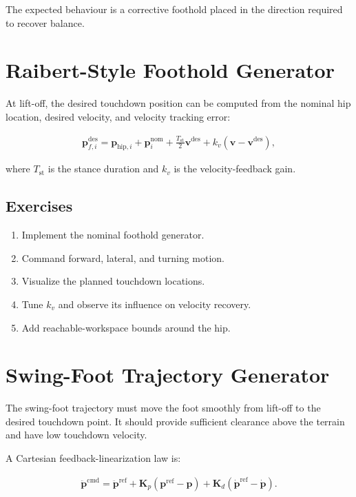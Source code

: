 \documentclass[11pt,a4paper]{article}
\begin{document}
The expected behaviour is a corrective foothold placed in the direction required to recover balance.


\section{Raibert-Style Foothold Generator}

At lift-off, the desired touchdown position can be computed from the nominal hip location, desired velocity, and velocity tracking error:

\begin{align*}
\bm{p}_{f,i}^{\mathrm{des}} =
\bm{p}_{\mathrm{hip},i}
+
\bm{p}_{i}^{\mathrm{nom}}
+
\frac{T_{\mathrm{st}}}{2}\bm{v}^{\mathrm{des}}
+
k_v
\left(
\bm{v} - \bm{v}^{\mathrm{des}}
\right),
\end{align*}

where \(T_{\mathrm{st}}\) is the stance duration and \(k_v\) is the velocity-feedback gain.


\subsection*{Exercises}



\begin{enumerate}[label=\arabic*.]
    \item Implement the nominal foothold generator.
    \item Command forward, lateral, and turning motion.
    \item Visualize the planned touchdown locations.
    \item Tune \(k_v\) and observe its influence on velocity recovery.
    \item Add reachable-workspace bounds around the hip.
\end{enumerate}

\section{Swing-Foot Trajectory Generator}

The swing-foot trajectory must move the foot smoothly from lift-off to the desired touchdown point. It should provide sufficient clearance above the terrain and have low touchdown velocity.

A Cartesian feedback-linearization law is:

\begin{align*}
\ddot{\bm{p}}^{\mathrm{cmd}} =
\ddot{\bm{p}}^{\mathrm{ref}}
+
\bm{K}_p
\left(
\bm{p}^{\mathrm{ref}}-\bm{p}
\right)
+
\bm{K}_d
\left(
\dot{\bm{p}}^{\mathrm{ref}}-\dot{\bm{p}}
\right).
\end{align*}
 
\end{document}
